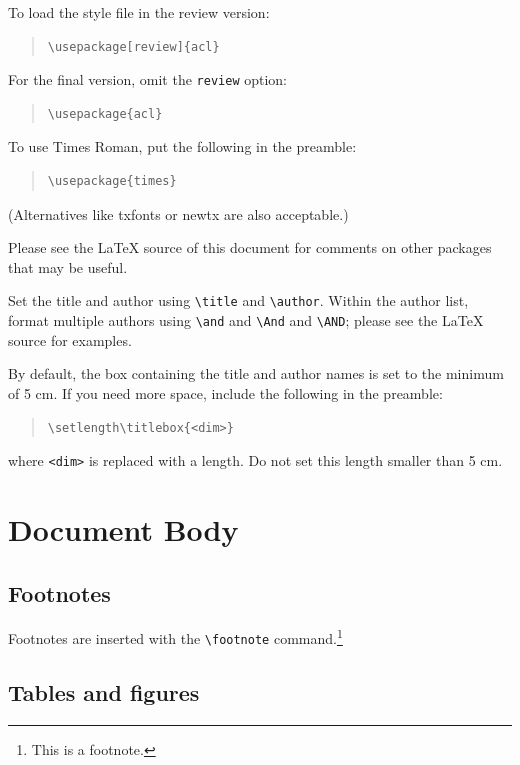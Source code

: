 To load the style file in the review version:
\begin{quote}
\begin{verbatim}
\usepackage[review]{acl}
\end{verbatim}
\end{quote}
For the final version, omit the \verb|review| option:
\begin{quote}
\begin{verbatim}
\usepackage{acl}
\end{verbatim}
\end{quote}

To use Times Roman, put the following in the preamble:
\begin{quote}
\begin{verbatim}
\usepackage{times}
\end{verbatim}
\end{quote}
(Alternatives like txfonts or newtx are also acceptable.)

Please see the \LaTeX{} source of this document for comments on other packages that may be useful.

Set the title and author using \verb|\title| and \verb|\author|. Within the author list, format multiple authors using \verb|\and| and \verb|\And| and \verb|\AND|; please see the \LaTeX{} source for examples.

By default, the box containing the title and author names is set to the minimum of 5 cm. If you need more space, include the following in the preamble:
\begin{quote}
\begin{verbatim}
\setlength\titlebox{<dim>}
\end{verbatim}
\end{quote}
where \verb|<dim>| is replaced with a length. Do not set this length smaller than 5 cm.

\section{Document Body}

\subsection{Footnotes}

Footnotes are inserted with the \verb|\footnote| command.\footnote{This is a footnote.}

\subsection{Tables and figures}

